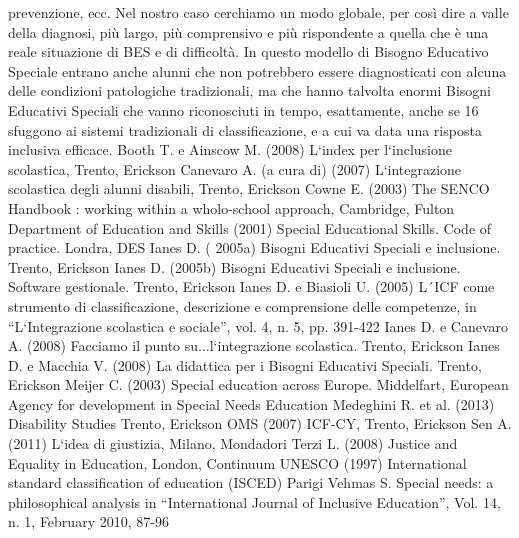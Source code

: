 prevenzione, ecc. Nel nostro caso cerchiamo un modo globale, per così dire a valle della diagnosi,
più largo, più comprensivo e più rispondente a quella che è una reale situazione di BES e di
difficoltà. In questo modello di Bisogno Educativo Speciale entrano anche alunni che non
potrebbero essere diagnosticati con alcuna delle condizioni patologiche tradizionali, ma che hanno
talvolta enormi Bisogni Educativi Speciali che vanno riconosciuti in tempo, esattamente, anche se
16
sfuggono ai sistemi tradizionali di classificazione, e a cui va data una risposta inclusiva efficace.
Booth T. e Ainscow M. (2008) L`index per l`inclusione scolastica, Trento, Erickson
Canevaro A. (a cura di) (2007) L`integrazione scolastica degli alunni disabili, Trento,
Erickson
Cowne E. (2003) The SENCO Handbook : working within a wholo-school approach,
Cambridge, Fulton
Department of Education and Skills (2001) Special Educational Skills. Code of practice. Londra,
DES
Ianes D. ( 2005a) Bisogni Educativi Speciali e inclusione. Trento, Erickson
Ianes D. (2005b) Bisogni Educativi Speciali e inclusione. Software gestionale. Trento, Erickson
Ianes D. e Biasioli U. (2005) L´ICF come strumento di classificazione, descrizione e
comprensione delle competenze, in “L`Integrazione scolastica e sociale”, vol. 4, n. 5, pp. 391-422
Ianes D. e Canevaro A. (2008) Facciamo il punto su...l`integrazione scolastica. Trento, Erickson
Ianes D. e Macchia V. (2008) La didattica per i Bisogni Educativi Speciali. Trento, Erickson
Meijer C. (2003) Special education across Europe. Middelfart, European Agency for
development in Special Needs Education
Medeghini R. et al. (2013) Disability Studies Trento, Erickson
OMS (2007) ICF-CY, Trento, Erickson
Sen A. (2011) L`idea di giustizia, Milano, Mondadori
Terzi L. (2008) Justice and Equality in Education, London, Continuum
UNESCO (1997) International standard classification of education (ISCED) Parigi
Vehmas S. Special needs: a philosophical analysis in “International Journal of Inclusive
Education”, Vol. 14, n. 1, February 2010, 87-96
